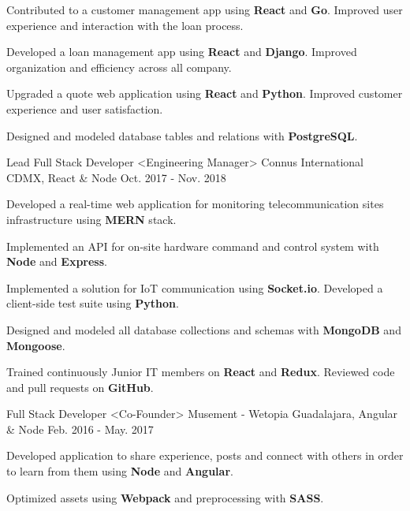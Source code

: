 \begin{cventries}
{\begin{cvitems}
        \item {Contributed to a customer management app using \textbf{React} and \textbf{Go}. Improved user experience and interaction with the loan process.}
        \item {Developed a loan management app using \textbf{React} and \textbf{Django}. Improved organization and efficiency across all company.}
        \item {Upgraded a quote web application using \textbf{React} and \textbf{Python}. Improved customer experience and user satisfaction.}
        \item {Designed and modeled database tables and relations with \textbf{PostgreSQL}.}
      \end{cvitems}
    }
  \cventry
    {Lead Full Stack Developer <Engineering Manager>}
    {Connus International}
    {CDMX, React \& Node}
    {Oct. 2017 - Nov. 2018}
    {
      \begin{cvitems}
        \item {Developed a real-time web application for monitoring telecommunication sites infrastructure using \textbf{MERN} stack.}
        \item {Implemented an API for on-site hardware command and control system with \textbf{Node} and \textbf{Express}.}
        \item {Implemented a solution for IoT communication using \textbf{Socket.io}. Developed a client-side test suite using \textbf{Python}.}
        \item {Designed and modeled all database collections and schemas with \textbf{MongoDB} and \textbf{Mongoose}.}
        \item {Trained continuously Junior IT members on \textbf{React} and \textbf{Redux}. Reviewed code and pull requests on \textbf{GitHub}.}
      \end{cvitems}
    }
    \cventry
      {Full Stack Developer <Co-Founder>}
      {Musement - Wetopia}
      {Guadalajara, Angular \& Node}
      {Feb. 2016 - May. 2017}
      {
        \begin{cvitems}
          \item {Developed application to share experience, posts and connect with others in order to learn from them using \textbf{Node} and \textbf{Angular}.}
          \item {Optimized assets using \textbf{Webpack} and preprocessing with \textbf{SASS}.}
        \end{cvitems}
      }
  \end{cventries}
